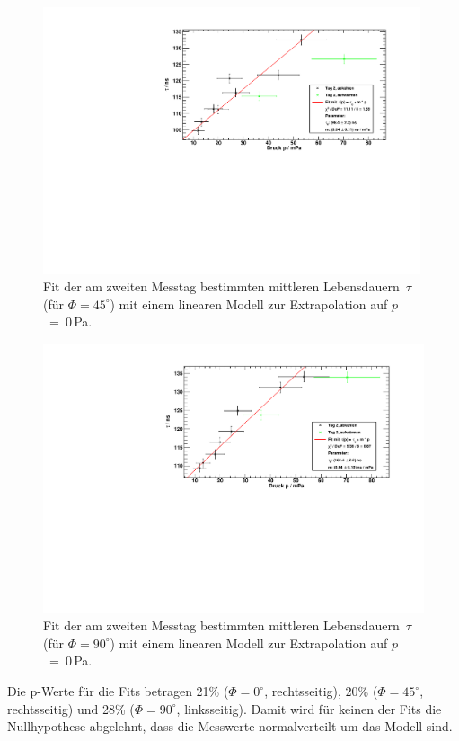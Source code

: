 \begin{figure}[H]
\begin{center}
  \includegraphics[width=0.99\textwidth]{../img/taus_45_day2.pdf}
  \caption{Fit der am zweiten Messtag bestimmten mittleren Lebensdauern~$\tau$ (für $\Phi=45^\circ$) mit einem linearen Modell
  zur Extrapolation auf \mbox{$p$ = 0\,Pa}.}
  \label{img:taus:day2:45}
\end{center}
\end{figure}

\begin{figure}[H]
\begin{center}
  \includegraphics[width=\textwidth]{../img/taus_90_day2.pdf}
  \caption{Fit der am zweiten Messtag bestimmten mittleren Lebensdauern~$\tau$ (für $\Phi=90^\circ$) mit einem linearen Modell
  zur Extrapolation auf \mbox{$p$ = 0\,Pa}.}
  \label{img:taus:day2:90}
\end{center}
\end{figure}
Die p-Werte für die Fits betragen 21\% ($\Phi=0^\circ$, rechtsseitig), 20\% ($\Phi=45^\circ$, rechtsseitig) und 
28\% ($\Phi=90^\circ$, linksseitig). Damit wird für keinen der Fits die Nullhypothese abgelehnt, dass die Messwerte normalverteilt 
um das Modell sind.


